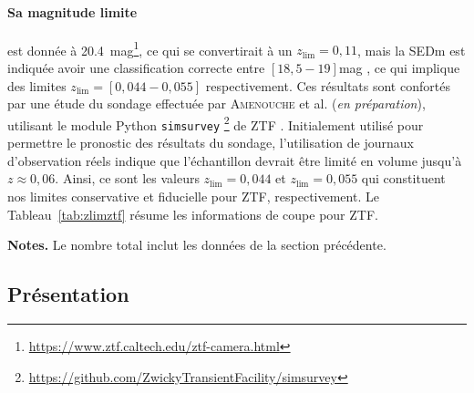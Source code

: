 \documentclass[../main/main.tex]{subfiles}
\begin{document}
\paragraph*{Sa magnitude limite} est donnée à
\SI{20.4}{mag}\footnote{\href{https://www.ztf.caltech.edu/ztf-camera.html}
{https://www.ztf.caltech.edu/ztf-camera.html}}, ce qui se convertirait à un
$z_{\lim} = 0,11$, mais la SEDm est indiquée avoir une classification correcte
entre $[18,5-19]$\si{mag} \citep{fremling2020}, ce qui implique des limites
$z_{\lim} = [0,044-0,055]$ respectivement. Ces résultats sont confortés par une
étude du sondage effectuée par \textsc{Amenouche} et al. (\textit{en
préparation}), utilisant le module Python
\texttt{simsurvey}
\footnote{\href{https://github.com/ZwickyTransientFacility/simsurvey}
{https://github.com/ZwickyTransientFacility/simsurvey}} de ZTF
\citep{feindt2019}. Initialement utilisé pour permettre le pronostic des
résultats du sondage, l'utilisation de journaux d'observation réels indique que
l'échantillon devrait être limité en volume jusqu'à $z \approx 0,06$. Ainsi, ce
sont les valeurs $z_{\lim} = 0,044$ et $z_{\lim} = 0,055$ qui constituent nos
limites conservative et fiducielle pour ZTF, respectivement. Le
Tableau~\ref{tab:zlimztf} résume les informations de coupe pour ZTF.

\begin{table}[ht]
    \centering
        \caption{Composition en SNe~Ia pour notre échantillon ZTF.}
        \label{tab:zlimztf}
    \begin{threeparttable}
        \begin{tablenotes}[flushleft]
            \item\small \textbf{\hspace{-3,2pt}Notes.} Le nombre total inclut les
                données de la section précédente.
        \end{tablenotes}
    \end{threeparttable}
\end{table}

\subsection{Présentation}\label{ssec:ztfpres}
\end{document}
